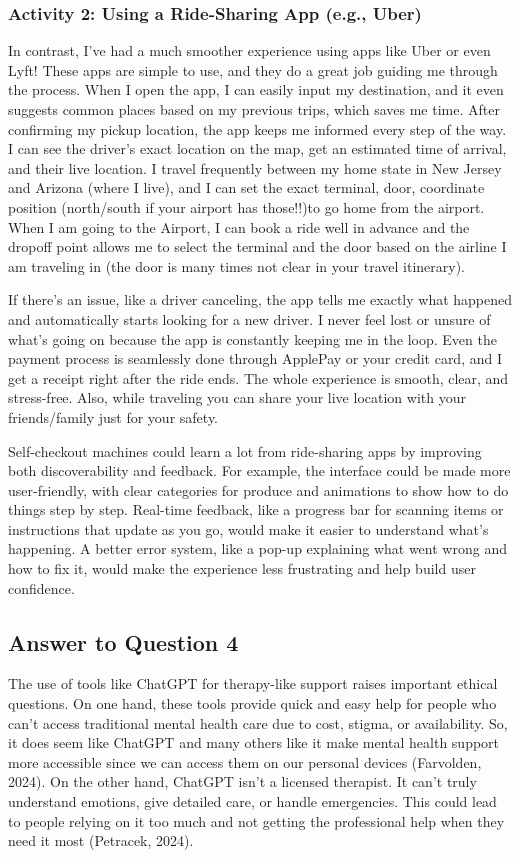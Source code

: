 \documentclass[
	letterpaper, %
]{jdf}
\begin{document}
\subsubsection {Activity 2: Using a Ride-Sharing App (e.g., Uber)}
In contrast, I’ve had a much smoother experience using apps like Uber or even Lyft! These apps are simple to use, and they do a great job guiding me through the process. When I open the app, I can easily input my destination, and it even suggests common places based on my previous trips, which saves me time. After confirming my pickup location, the app keeps me informed every step of the way. I can see the driver’s exact location on the map, get an estimated time of arrival, and their live location. I travel frequently between my home state in New Jersey and Arizona (where I live), and I can set the exact terminal, door, coordinate position (north/south if your airport has those!!)to go home from the airport. When I am going to the Airport, I can book a ride well in advance and the dropoff point allows me to select the terminal and the door based on the airline I am traveling in (the door is many times not clear in your travel itinerary).

If there’s an issue, like a driver canceling, the app tells me exactly what happened and automatically starts looking for a new driver. I never feel lost or unsure of what’s going on because the app is constantly keeping me in the loop. Even the payment process is seamlessly done through ApplePay or your credit card, and I get a receipt right after the ride ends. The whole experience is smooth, clear, and stress-free. Also, while traveling you can share your live location with your friends/family just for your safety. 

Self-checkout machines could learn a lot from ride-sharing apps by improving both discoverability and feedback. For example, the interface could be made more user-friendly, with clear categories for produce and animations to show how to do things step by step. Real-time feedback, like a progress bar for scanning items or instructions that update as you go, would make it easier to understand what’s happening. A better error system, like a pop-up explaining what went wrong and how to fix it, would make the experience less frustrating and help build user confidence.
\newpage

\subsection{Answer to Question 4}
The use of tools like ChatGPT for therapy-like support raises important ethical questions. On one hand, these tools provide quick and easy help for people who can’t access traditional mental health care due to cost, stigma, or availability. So, it does seem like ChatGPT and many others like it make mental health support more accessible since we can access them on our personal devices (Farvolden, 2024). On the other hand, ChatGPT isn’t a licensed therapist. It can’t truly understand emotions, give detailed care, or handle emergencies. This could lead to people relying on it too much and not getting the professional help when they need it most (Petracek, 2024).
\end{document}
